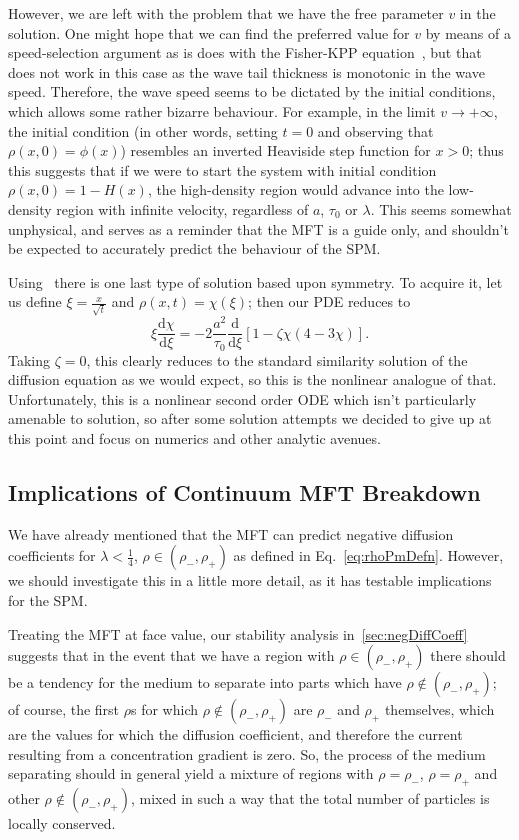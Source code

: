 However, we are left with the problem that we have the free parameter $v$ in the solution. One might hope that we can find the preferred value for $v$ by means of a speed-selection argument as is does with the Fisher-KPP
equation~\cite{sherrat1998}, but that does not work in this case as the wave tail thickness is monotonic in the wave speed. Therefore, the wave speed seems to be dictated by the initial conditions, which allows some rather bizarre
behaviour. For example, in the limit $v \rightarrow +\infty$, the initial condition (in other words, setting $t=0$ and observing that $\rho(x, 0) = \phi(x)$) resembles an inverted Heaviside step function for $x>0$; thus this
suggests that if we were to start the system with initial condition $\rho(x, 0) = 1 - H(x)$, the high-density region would advance into the low-density region with infinite velocity, regardless of $a$, $\tau_0$ or $\lambda$.
This seems somewhat unphysical, and serves as a reminder that the MFT is a guide only, and shouldn't be expected to accurately predict the behaviour of the SPM.

Using~\cite{ivanova2007} there is one last type of solution based upon symmetry. To acquire it, let us define $\xi = \frac{x}{\sqrt{t}}$ and $\rho(x, t) = \chi(\xi)$; then our PDE reduces to
\begin{equation}
 \xi \frac{\mathrm{d}\chi}{\mathrm{d}\xi} = -2\frac{a^2}{\tau_0} \frac{\mathrm{d}}{\mathrm{d}\xi}\left[ 1-\zeta \chi \left(4-3\chi\right) \right].
\end{equation}
Taking $\zeta=0$, this clearly reduces to the standard similarity solution of the diffusion equation as we would expect, so this is the nonlinear analogue of that. Unfortunately, this is a nonlinear second order ODE
which isn't particularly amenable to solution, so after some solution attempts we decided to give up at this point and focus on numerics and other analytic avenues.



\subsection{Implications of Continuum MFT Breakdown}
We have already mentioned that the MFT can predict negative diffusion coefficients for $\lambda<\frac{1}{4}$, $\rho \in (\rho_-, \rho_+)$ as defined in Eq.~\eqref{eq:rhoPmDefn}. However, we should investigate this in a little
more detail, as it has testable implications for the SPM.

Treating the MFT at face value, our stability analysis in~\ref{sec:negDiffCoeff} suggests that in the event that we have a region with $\rho \in (\rho_-, \rho_+)$ there should be a tendency for the medium to separate into parts which
have $\rho \not\in (\rho_-, \rho_+)$; of course, the first $\rho$s for which $\rho \not\in (\rho_-, \rho_+)$ are $\rho_-$ and $\rho_+$ themselves, which are the values for which the diffusion coefficient, and therefore the current
resulting from a concentration gradient is zero. So, the process of the medium separating should in general yield a mixture of regions with $\rho = \rho_-$, $\rho = \rho_+$ and other $\rho \not\in (\rho_-, \rho_+)$, mixed in
such a way that the total number of particles is locally conserved.

